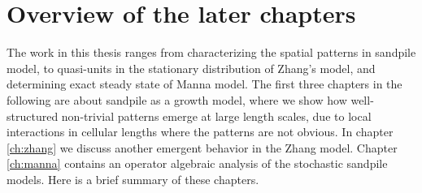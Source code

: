\documentclass[11pt,a4paper]{book}
\begin{document}
\section{Overview of the later chapters}
The work in this thesis ranges from characterizing the spatial
patterns in sandpile model, to quasi-units in the stationary
distribution of Zhang's model, and determining exact steady state of
Manna model. The first three chapters in the following are about
sandpile as a growth model, where we show how well-structured
non-trivial patterns emerge at large length scales, due to local interactions in cellular
lengths where the patterns are not obvious. In chapter \ref{ch:zhang}
we discuss another emergent behavior in the Zhang model. Chapter
\ref{ch:manna} contains an operator algebraic analysis of the
stochastic sandpile models. Here is a brief summary of these chapters.
\end{document}
